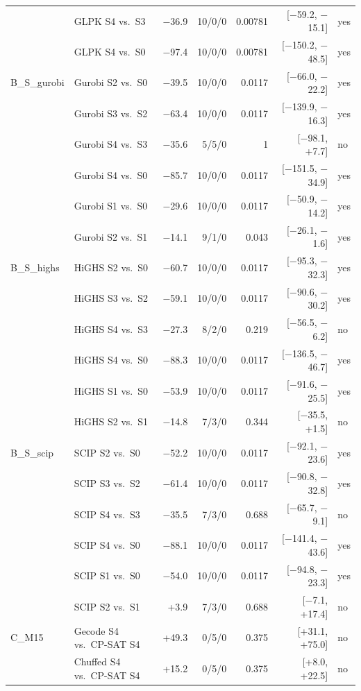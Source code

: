 \begin{longtable}{llrrrrl}
 & GLPK S4 vs.\ S3 & $-$36.9 & 10/0/0 & 0.00781 & [$-$59.2, $-$15.1] & yes \\
 & GLPK S4 vs.\ S0 & $-$97.4 & 10/0/0 & 0.00781 & [$-$150.2, $-$48.5] & yes \\
B\_S\_gurobi & Gurobi S2 vs.\ S0 & $-$39.5 & 10/0/0 & 0.0117 & [$-$66.0, $-$22.2] & yes \\
 & Gurobi S3 vs.\ S2 & $-$63.4 & 10/0/0 & 0.0117 & [$-$139.9, $-$16.3] & yes \\
 & Gurobi S4 vs.\ S3 & $-$35.6 & 5/5/0 & 1 & [$-$98.1, +7.7] & no \\
 & Gurobi S4 vs.\ S0 & $-$85.7 & 10/0/0 & 0.0117 & [$-$151.5, $-$34.9] & yes \\
 & Gurobi S1 vs.\ S0 & $-$29.6 & 10/0/0 & 0.0117 & [$-$50.9, $-$14.2] & yes \\
 & Gurobi S2 vs.\ S1 & $-$14.1 & 9/1/0 & 0.043 & [$-$26.1, $-$1.6] & yes \\
B\_S\_highs & HiGHS S2 vs.\ S0 & $-$60.7 & 10/0/0 & 0.0117 & [$-$95.3, $-$32.3] & yes \\
 & HiGHS S3 vs.\ S2 & $-$59.1 & 10/0/0 & 0.0117 & [$-$90.6, $-$30.2] & yes \\
 & HiGHS S4 vs.\ S3 & $-$27.3 & 8/2/0 & 0.219 & [$-$56.5, $-$6.2] & no \\
 & HiGHS S4 vs.\ S0 & $-$88.3 & 10/0/0 & 0.0117 & [$-$136.5, $-$46.7] & yes \\
 & HiGHS S1 vs.\ S0 & $-$53.9 & 10/0/0 & 0.0117 & [$-$91.6, $-$25.5] & yes \\
 & HiGHS S2 vs.\ S1 & $-$14.8 & 7/3/0 & 0.344 & [$-$35.5, +1.5] & no \\
B\_S\_scip & SCIP S2 vs.\ S0 & $-$52.2 & 10/0/0 & 0.0117 & [$-$92.1, $-$23.6] & yes \\
 & SCIP S3 vs.\ S2 & $-$61.4 & 10/0/0 & 0.0117 & [$-$90.8, $-$32.8] & yes \\
 & SCIP S4 vs.\ S3 & $-$35.5 & 7/3/0 & 0.688 & [$-$65.7, $-$9.1] & no \\
 & SCIP S4 vs.\ S0 & $-$88.1 & 10/0/0 & 0.0117 & [$-$141.4, $-$43.6] & yes \\
 & SCIP S1 vs.\ S0 & $-$54.0 & 10/0/0 & 0.0117 & [$-$94.8, $-$23.3] & yes \\
 & SCIP S2 vs.\ S1 & +3.9 & 7/3/0 & 0.688 & [$-$7.1, +17.4] & no \\
C\_M15 & Gecode S4 vs.\ CP-SAT S4 & +49.3 & 0/5/0 & 0.375 & [+31.1, +75.0] & no \\
 & Chuffed S4 vs.\ CP-SAT S4 & +15.2 & 0/5/0 & 0.375 & [+8.0, +22.5] & no \\

\end{longtable}
